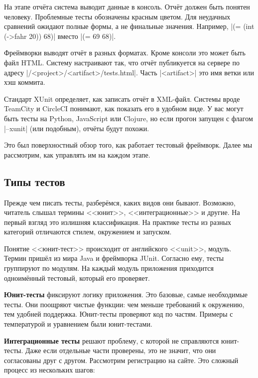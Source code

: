 На этапе отчёта система выводит данные в консоль. Отчёт должен быть понятен
человеку. Проблемные тесты обозначены красным цветом. Для неудачных сравнений
ожидают полные формы, а не финальные значения. Например,
\spverb|(= (int (->fahr 20)) 68)| вместо \spverb|(= 69 68)|.

Фреймворки выводят отчёт в разных форматах. Кроме консоли это может быть файл
HTML. Систему настраивают так, что отчёт публикуется на сервере по адресу
\spverb|/<project>/<artifact>/tests.html|. Часть \spverb|<artifact>| это имя
ветки или хэш коммита.

Стандарт XUnit определяет, как записать отчёт в XML-файл. Системы вроде TeamCity
и CircleCI понимают, как показать его в удобном виде. У вас могут быть тесты на
Python, JavaScript или Clojure, но если прогон запущен с флагом \spverb|--xunit|
(или подобным), отчёты будут похожи.

Это был поверхностный обзор того, как работает тестовый фреймворк. Далее мы
рассмотрим, как управлять им на каждом этапе.

\subsection{Типы тестов}


Прежде чем писать тесты, разберёмся, каких видов они бывают. Возможно, читатель
слышал термины <<юнит>>, <<интеграционные>> и другие. На первый взгляд это
излишняя классификация. На практике тесты из разных категорий отличаются стилем,
окружением и запуском.

Понятие <<юнит-тест>> происходит от английского <<unit>>, модуль. Термин пришёл
из мира Java и фреймворка JUnit. Согласно ему, тесты группируют по модулям. На
каждый модуль приложения приходится одноимённый тестовый, который его проверяет.

\textbf{Юнит-тесты} фиксируют логику приложения. Это базовые, самые необходимые
тесты. Они поощряют чистые функции: чем меньше требований к окружению, тем
удобней поддержка. Юнит-тесты проверяют код по частям. Примеры с температурой и
уравнением были юнит-тестами.


\textbf{Интеграционные тесты} решают проблему, с которой не справляются
юнит-тесты. Даже если отдельные части проверены, это не значит, что они
согласованы друг с другом. Рассмотрим регистрацию на сайте. Это сложный процесс
из нескольких шагов:

